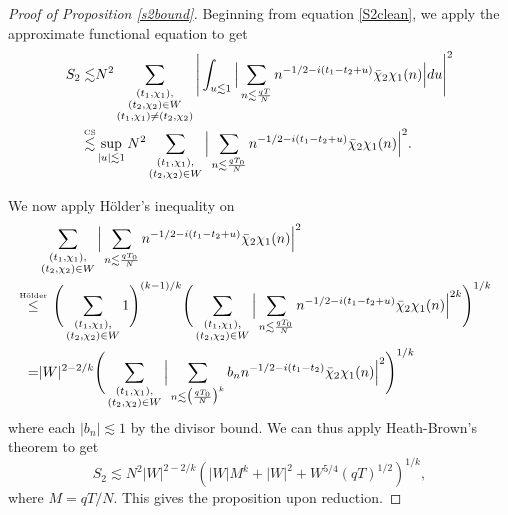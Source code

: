 \begin{proof}[Proof of Proposition \ref{s2bound}]
    Beginning from equation \ref{S2clean}, we apply the approximate functional equation to get \begin{align*}
    S_2\lesssim& N^2  \sum_{\substack{(t_1,\chi_1),\\(t_2,\chi_2)\in W \\ (t_1,\chi_1)\neq (t_2,\chi_2)}} \Bigg|
    \int_{u\lesssim 1}\Big|\sum_{n\lesssim \frac{qT}{N}}n^{-1/2-i(t_1-t_2+u)}\bar{\chi}_2\chi_1(n)\Big| du\Bigg|^2\\
    \stackon{CS}{\lesssim}& \sup_{|u|\lesssim 1} N^2  \sum_{\substack{(t_1,\chi_1),\\(t_2,\chi_2)\in W}} \Big|\sum_{n\lesssim \frac{q{T_0}}{N}}n^{-1/2-i(t_1-t_2+u)}\bar{\chi}_2\chi_1(n)\Big|^2.
    \end{align*}

    We now apply H\"older's inequality on \begin{align*}
        &\sum_{\substack{(t_1,\chi_1),\\(t_2,\chi_2)\in W}} \Big|\sum_{n\lesssim \frac{q{T_0}}{N}}n^{-1/2-i(t_1-t_2+u)}\bar{\chi}_2\chi_1(n)\Big|^2\\
        \stackon{H\"older}{\leq}&  \quad \Bigg(\sum_{\substack{(t_1,\chi_1),\\(t_2,\chi_2)\in W}} 1 \Bigg)^{(k-1)/k} \Bigg(\sum_{\substack{(t_1,\chi_1),\\(t_2,\chi_2)\in W}}
            \Big|\sum_{n\lesssim \frac{q{T_0}}{N}}n^{-1/2-i(t_1-t_2+u)}\bar{\chi}_2\chi_1(n)\Big|^{2k}\Bigg)^{1/k}\\
        =&|W|^{2-2/k}\Bigg(\sum_{\substack{(t_1,\chi_1),\\(t_2,\chi_2)\in W}}
        \Big|\sum_{n\lesssim \big(\frac{q{T_0}}{N}\big)^k} b_n n^{-1/2-i(t_1-t_2)}\bar{\chi}_2\chi_1(n)\Big|^2\Bigg)^{1/k}
    \end{align*}
    where each $|b_n|\lesssim 1$ by the divisor bound. We can thus apply Heath-Brown's theorem to get \[
    S_2 \lesssim N^2 |W|^{2-2/k}(|W|M^k+|W|^2+W^{5/4}(qT)^{1/2})^{1/k},
    \]where $M=qT/N$. This gives the proposition upon reduction.
\end{proof}